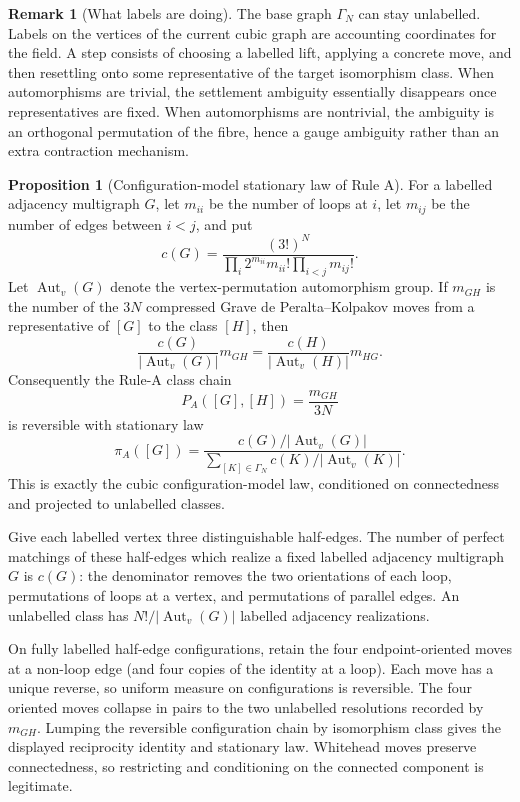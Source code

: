 \documentclass[11pt]{article}
\makeatletter
\newcommand{\G}{\Gamma}
\newcommand{\Aut}{\operatorname{Aut}}
\theoremstyle{definition}
\newtheorem{proposition}[theorem]{Proposition}
\newtheorem{remark}[theorem]{Remark}
\renewenvironment{proof}[1][\proofname]{\par
  \pushQED{\qed}%
  \normalfont \topsep6\p@\@plus6\p@\relax
  \trivlist
  \item[\hskip\labelsep\bfseries #1\@addpunct{.}]\ignorespaces
}{%
  \popQED\endtrivlist\@endpefalse
}
\makeatother
\begin{document}
\begin{remark}[What labels are doing]
The base graph $\G_N$ can stay unlabelled.  Labels on the vertices of the
current cubic graph are accounting coordinates for the field.  A step consists
of choosing a labelled lift, applying a concrete move, and then resettling onto
some representative of the target isomorphism class.  When automorphisms are
trivial, the settlement ambiguity essentially disappears once representatives
are fixed.  When automorphisms are nontrivial, the ambiguity is an orthogonal
permutation of the fibre, hence a gauge ambiguity rather than an extra
contraction mechanism.
\end{remark}

\begin{proposition}[Configuration-model stationary law of Rule A]
For a labelled adjacency multigraph $G$, let $m_{ii}$ be the number of loops at
$i$, let $m_{ij}$ be the number of edges between $i<j$, and put
\[
    c(G)=
    \frac{(3!)^N}
    {\prod_i2^{m_{ii}}m_{ii}!\prod_{i<j}m_{ij}!}.
\]
Let $\Aut_v(G)$ denote the vertex-permutation automorphism group.  If
$m_{GH}$ is the number of the $3N$ compressed Grave
de Peralta--Kolpakov moves from a representative of $[G]$ to the class $[H]$,
then
\[
    \frac{c(G)}{|\Aut_v(G)|}m_{GH}
    =
    \frac{c(H)}{|\Aut_v(H)|}m_{HG}.
\]
Consequently the Rule-A class chain
\[
    P_A([G],[H])=\frac{m_{GH}}{3N}
\]
is reversible with stationary law
\[
    \pi_A([G])
    =
    \frac{c(G)/|\Aut_v(G)|}
    {\sum_{[K]\in\G_N}c(K)/|\Aut_v(K)|}.
\]
This is exactly the cubic configuration-model law, conditioned on
connectedness and projected to unlabelled classes.
\end{proposition}

\begin{proof}
Give each labelled vertex three distinguishable half-edges.  The number of
perfect matchings of these half-edges which realize a fixed labelled adjacency
multigraph $G$ is $c(G)$: the denominator removes the two orientations of each
loop, permutations of loops at a vertex, and permutations of parallel edges.
An unlabelled class has $N!/|\Aut_v(G)|$ labelled adjacency realizations.

On fully labelled half-edge configurations, retain the four endpoint-oriented
moves at a non-loop edge (and four copies of the identity at a loop).  Each
move has a unique reverse, so uniform measure on configurations is reversible.
The four oriented moves collapse in pairs to the two unlabelled resolutions
recorded by $m_{GH}$.  Lumping the reversible configuration chain by
isomorphism class gives the displayed reciprocity identity and stationary law.
Whitehead moves preserve connectedness, so restricting and conditioning on
the connected component is legitimate.
\end{proof}
\end{document}
